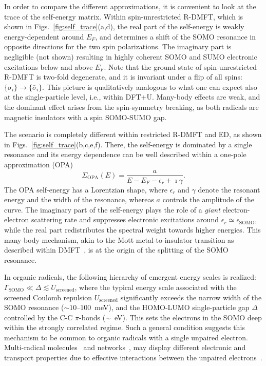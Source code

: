\documentclass[aps,prx,twocolumn,superscriptaddress]{revtex4-2}
\begin{document}
In order to compare the different approximations, it is convenient to look at the trace of the self-energy matrix. 
Within spin-unrestricted R-DMFT, which is shown in Figs.~\ref{fig:self_trace}(a,d), 
the real part of the self-energy is weakly energy-dependent around $E_F$,  
and determines a shift of the SOMO resonance in opposite directions 
for the two spin polarizations. 
The imaginary part is negligible (not shown) 
resulting in highly coherent SOMO and SUMO electronic excitations below and above $E_F$.
Note that the ground state of spin-unrestricted R-DMFT is two-fold degenerate, 
and it is invariant under a flip of all spins: $\{\sigma_i\}\rightarrow\{\bar{\sigma}_i\}$. 
This picture is qualitatively analogous to what one can expect 
also at the single-particle level, i.e., within DFT+U. 
Many-body effects are weak, and the dominant effect arises from the spin-symmetry breaking, 
as both radicals are magnetic insulators with a spin SOMO-SUMO gap.  

The scenario is completely different within restricted R-DMFT and ED,  
as shown in Figs.~\ref{fig:self_trace}(b,c,e,f).  
There, the self-energy is dominated by a single resonance
and its energy dependence can be well described within a one-pole approximation (OPA)
\begin{equation}
    \Sigma_{\mathrm{OPA}}(E) = \frac{a}{E-E_F-\epsilon_r + \imath \gamma}. 
\end{equation}
The OPA self-energy has a Lorentzian shape, where $\epsilon_r$ and $\gamma$ denote 
the resonant energy and the width of the resonance, 
whereas $a$ controls the amplitude of the curve. 
The imaginary part of the self-energy plays the role of a \emph{giant} electron-electron scattering rate 
and suppresses electronic excitations around $\epsilon_r \simeq \epsilon_{\mathrm{SOMO}}$, 
while the real part redistributes the spectral weight towards higher energies.
This many-body mechanism, akin to the Mott metal-to-insulator transition as described within DMFT~\cite{georgesRMP68},   
is at the origin of the splitting of the SOMO resonance. 

In organic radicals, the following hierarchy of emergent energy scales is realized: 
$\Gamma_{\mathrm{SOMO}} \ll \Delta \lesssim U_{\mathrm{screened}}$, 
where the typical energy scale associated with the screened Coulomb repulsion $U_{\mathrm{screened}}$ 
significantly exceeds the narrow width of the SOMO resonance ($\sim 10$--$100$~meV), 
and the HOMO-LUMO single-particle gap $\Delta$ controlled by the C-C $\pi$-bonds ($\sim$~eV). 
This sets the electrons in the SOMO deep within the strongly correlated regime. 
Such a general condition suggests this mechanism to be common to organic radicals 
with a single unpaired electron. 
Multi-radical molecules~\cite{mishra2020topological} and networks~\cite{alcon2022unveiling}, 
may display different electronic and transport properties due to effective interactions 
between the unpaired electrons~\cite{mishra2021observation,turco2021surface,jacob2022theory,zhengNC11}.
\end{document}
